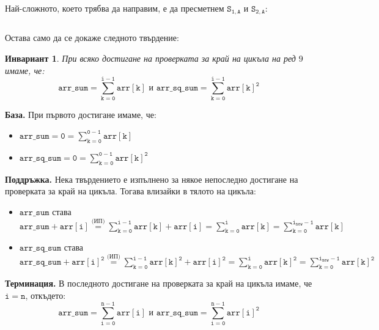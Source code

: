 \documentclass{article}
\theoremstyle{definition}
\theoremstyle{plain}
\newtheorem*{invariant}{Инвариант}
\theoremstyle{remark}
\theoremstyle{definition}
\begin{document}
Най-сложното, което трябва да направим, е да пресметнем $\mathtt{S_{1, A}}$ и $\mathtt{S_{2, A}}$:
\inputminted[linenos]{c++}{algorithms/find_missing_and_duplicate.cpp}

Остава само да се докаже следното твърдение:

\begin{invariant}
  При всяко достигане на проверката за край на цикъла на ред $9$ имаме, че:
  \[
    \mathtt{arr\_sum = \sum\limits_{k = 0}^{i - 1} arr[k] \text{ и } arr\_sq\_sum = \sum\limits_{k = 0}^{i - 1} arr[k]^2}
  \]
\end{invariant}

\textbf{База.}
При първото достигане имаме, че:
\begin{itemize}
  \item $\mathtt{arr\_sum = 0 = \sum\limits_{k = 0}^{0 - 1} arr[k]}$
  \item $\mathtt{arr\_sq\_sum = 0 = \sum\limits_{k = 0}^{0 - 1} arr[k]^2}$
\end{itemize}

\textbf{Поддръжка.}
Нека твърдението е изпълнено за някое непоследно достигане на проверката за край на цикъла.
Тогава влизайки в тялото на цикъла:
\begin{itemize}
  \item $\mathtt{arr\_sum}$ става $\mathtt{arr\_sum + arr[i] \stackrel{\text{(ИП)}}{=} \sum\limits_{k = 0}^{i - 1} arr[k] + arr[i] = \sum\limits_{k = 0}^{i} arr[k] = \sum\limits_{k = 0}^{i_{new} - 1} arr[k]}$
  \item $\mathtt{arr\_sq\_sum}$ става $\mathtt{arr\_sq\_sum + arr[i]^2 \stackrel{\text{(ИП)}}{=} \sum\limits_{k = 0}^{i - 1} arr[k]^2 + arr[i]^2 = \sum\limits_{k = 0}^{i} arr[k]^2 = \sum\limits_{k = 0}^{i_{new} - 1} arr[k]^2}$
\end{itemize}

\textbf{Терминация.}
В последното достигане на проверката за край на цикъла имаме, че $\mathtt{i = n}$, откъдето:
\[
  \mathtt{arr\_sum = \sum\limits_{i = 0}^{n - 1} arr[i] \text{ и } arr\_sq\_sum = \sum\limits_{i = 0}^{n - 1} arr[i]^2}
\]
\end{document}
